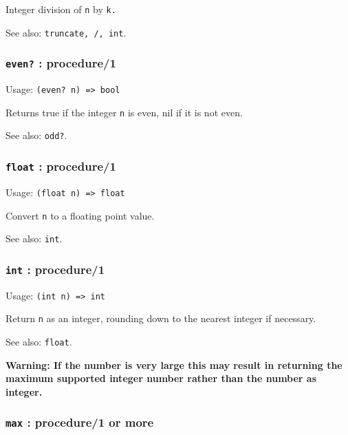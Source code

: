 \documentclass[
]{article}
\newcommand{\passthrough}[1]{#1}
\begin{document}
Integer division of \passthrough{\lstinline!n!} by
\passthrough{\lstinline!k.!}

See also: \passthrough{\lstinline!truncate, /, int!}.

\hypertarget{even-procedure1}{%
\subsubsection{\texorpdfstring{\texttt{even?} :
procedure/1}{even? : procedure/1}}\label{even-procedure1}}

Usage: \passthrough{\lstinline!(even? n) => bool!}

Returns true if the integer \passthrough{\lstinline!n!} is even, nil if
it is not even.

See also: \passthrough{\lstinline!odd?!}.

\hypertarget{float-procedure1}{%
\subsubsection{\texorpdfstring{\texttt{float} :
procedure/1}{float : procedure/1}}\label{float-procedure1}}

Usage: \passthrough{\lstinline!(float n) => float!}

Convert \passthrough{\lstinline!n!} to a floating point value.

See also: \passthrough{\lstinline!int!}.

\hypertarget{int-procedure1}{%
\subsubsection{\texorpdfstring{\texttt{int} :
procedure/1}{int : procedure/1}}\label{int-procedure1}}

Usage: \passthrough{\lstinline!(int n) => int!}

Return \passthrough{\lstinline!n!} as an integer, rounding down to the
nearest integer if necessary.

See also: \passthrough{\lstinline!float!}.

\textbf{Warning: If the number is very large this may result in
returning the maximum supported integer number rather than the number as
integer.}

\hypertarget{max-procedure1-or-more}{%
\subsubsection{\texorpdfstring{\texttt{max} : procedure/1 or
more}{max : procedure/1 or more}}\label{max-procedure1-or-more}}
\end{document}
